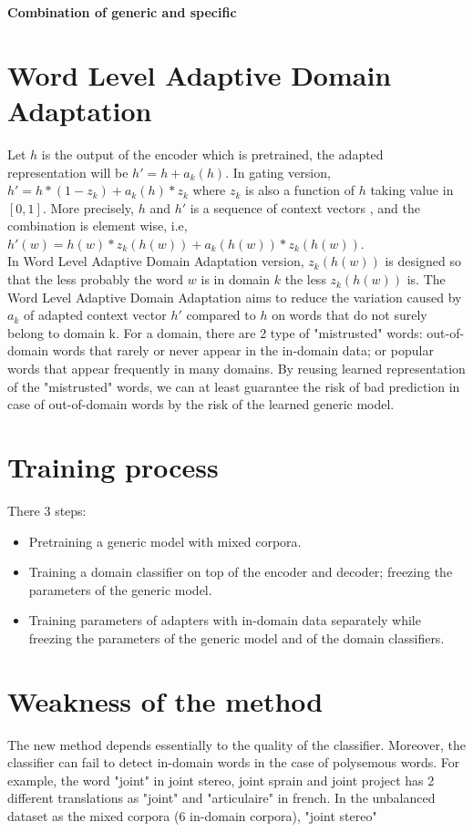 \documentclass[12pt,a4paper,twoside]{report}
\theoremstyle{definition}
\begin{document}
\begin{center}
{\LARGE \bf Combination of generic and specific}\\
\end{center}
\setlength{\belowdisplayskip}{8pt} \setlength{\belowdisplayshortskip}{8pt}
\setlength{\abovedisplayskip}{8pt} \setlength{\abovedisplayshortskip}{8pt}
\setlength{\parskip}{0.1cm}
\setlength{\parindent}{1em}
\section*{Word Level Adaptive Domain Adaptation}
Let $h$ is the output of the encoder which is pretrained, the adapted representation will be $h' = h + a_k(h)$. In gating version, $h' = h * (1-z_k) + a_k(h) * z_k$ where $z_k$ is also a function of $h$ taking value in $[0,1]$. More precisely, $h$ and $h'$ is a sequence of context vectors , and the combination is element wise, i.e, $h'(w) = h(w) * z_k(h(w)) + a_k(h(w)) * z_k(h(w))$. \\
In Word Level Adaptive Domain Adaptation version, $z_k(h(w))$ is designed so that the less probably the word $w$ is in domain $k$ the less $z_k(h(w))$ is. The Word Level Adaptive Domain Adaptation aims to reduce the variation caused by $a_k$ of adapted context vector $h'$ compared to $h$ on words that do not surely belong to domain k. For a domain, there are 2 type of "mistrusted" words: out-of-domain words that rarely or never appear in the in-domain data; or popular words that appear frequently in many domains. By reusing learned representation of the "mistrusted" words, we can at least guarantee the risk of bad prediction in case of out-of-domain words by the risk of the learned generic model.
\section*{Training process}
There 3 steps:
\begin{itemize}
	\item Pretraining a generic model with mixed corpora.
	\item Training a domain classifier on top of the encoder and decoder; freezing the parameters of the generic model.
	\item Training parameters of adapters with in-domain data separately while freezing the parameters of the generic model and of the domain classifiers.
\end{itemize}

\section*{Weakness of the method}
The new method depends essentially to the quality of the classifier. Moreover, the classifier can fail to detect in-domain words in the case of polysemous words. For example, the word "joint" in joint stereo, joint sprain and joint project has 2 different translations as "joint" and "articulaire" in french. In the unbalanced dataset as the mixed corpora (6 in-domain corpora),  "joint stereo"
\end{document}
